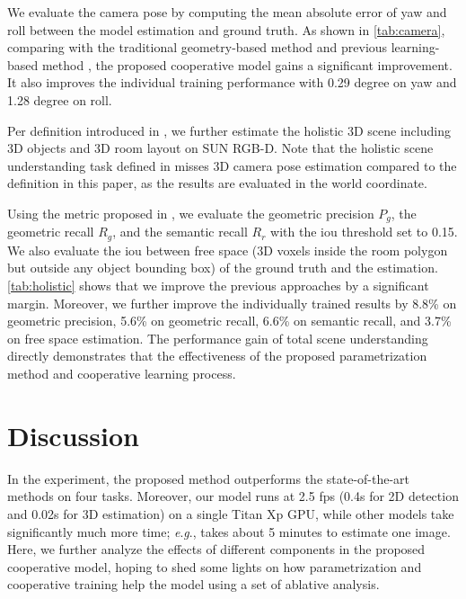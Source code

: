 \documentclass{article}
\makeatletter
\newcommand{\eg}{\textit{e}.\textit{g}.\@\xspace}
\renewcommand{\paragraph}{\@startsection{paragraph}{4}{\z@}{0ex \@plus 0ex \@minus 0ex}{-1em}{\hskip\parindent\normalfont\normalsize\bfseries}}
\makeatother
\begin{document}
We evaluate the camera pose by computing the mean absolute error of yaw and roll between the model estimation and ground truth. As shown in \autoref{tab:camera}, comparing with the traditional geometry-based method \citep{hedau2009recovering} and previous learning-based method \citep{huang2018holistic}, the proposed cooperative model gains a significant improvement. It also improves the individual training performance with 0.29 degree on yaw and 1.28 degree on roll.

\paragraph{Holistic Scene Understanding}

Per definition introduced in \citep{song2015sun}, we further estimate the holistic 3D scene including 3D objects and 3D room layout on SUN RGB-D. Note that the holistic scene understanding task defined in \citep{song2015sun} misses 3D camera pose estimation compared to the definition in this paper, as the results are evaluated in the world coordinate.

Using the metric proposed in \citep{song2015sun}, we evaluate the geometric precision $P_g$, the geometric recall $R_g$, and the semantic recall $R_r$ with the \ac{iou} threshold set to 0.15. We also evaluate the \ac{iou} between free space (3D voxels inside the room polygon but outside any object bounding box) of the ground truth and the estimation. \autoref{tab:holistic} shows that we improve the previous approaches by a significant margin. Moreover, we further improve the individually trained results by 8.8\% on geometric precision, 5.6\% on geometric recall, 6.6\% on semantic recall, and 3.7\% on free space estimation. The performance gain of total scene understanding directly demonstrates that the effectiveness of the proposed parametrization method and cooperative learning process.

\section{Discussion}

In the experiment, the proposed method outperforms the state-of-the-art methods on four tasks. Moreover, our model runs at 2.5 fps (0.4s for 2D detection and 0.02s for 3D estimation) on a single Titan Xp GPU, while other models take significantly much more time; \eg, \citep{izadinia2016im2cad} takes about 5 minutes to estimate one image. Here, we further analyze the effects of different components in the proposed cooperative model, hoping to shed some lights on how parametrization and cooperative training help the model using a set of ablative analysis.
\end{document}
